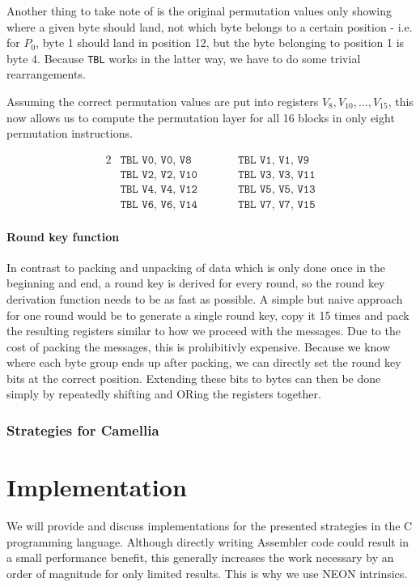 \documentclass[12pt]{report}
\begin{document}
Another thing to take note of is the original permutation values only showing
where a given byte should land, not which byte belongs to a certain position -
i.e. for $P_0$, byte 1 should land in position 12, but the byte belonging to
position 1 is byte 4. Because \texttt{TBL} works in the latter way, we have
to do some trivial rearrangements.

Assuming the correct permutation values are put into registers
$V_8,V_{10},\dots,V_{15}$, this now allows us to compute the permutation layer
for all 16 blocks in only eight permutation instructions.

\begin{alignat*}{2}
    &\texttt{TBL V0, V0, V8}\qquad &&\texttt{TBL V1, V1, V9} \\
    &\texttt{TBL V2, V2, V10}\qquad &&\texttt{TBL V3, V3, V11} \\
    &\texttt{TBL V4, V4, V12}\qquad &&\texttt{TBL V5, V5, V13} \\
    &\texttt{TBL V6, V6, V14}\qquad &&\texttt{TBL V7, V7, V15}
\end{alignat*}

\subsubsection{Round key function}

In contrast to packing and unpacking of data which is only done once in the
beginning and end, a round key is derived for every round, so the round key
derivation function needs to be as fast as possible. A simple but naive
approach for one round would be to generate a single round key, copy it 15
times and pack the resulting registers similar to how we proceed with the
messages. Due to the cost of packing the messages, this is prohibitivly
expensive. Because we know where each byte group ends up after packing, we can
directly set the round key bits at the correct position. Extending these bits
to bytes can then be done simply by repeatedly shifting and ORing the registers
together.

\subsection{Strategies for Camellia}

\chapter{Implementation}

We will provide and discuss implementations for the presented strategies in the
C programming language. Although directly writing Assembler code could result
in a small performance benefit, this generally increases the work necessary by
an order of magnitude for only limited results. This is why we use NEON
intrinsics.
\end{document}
